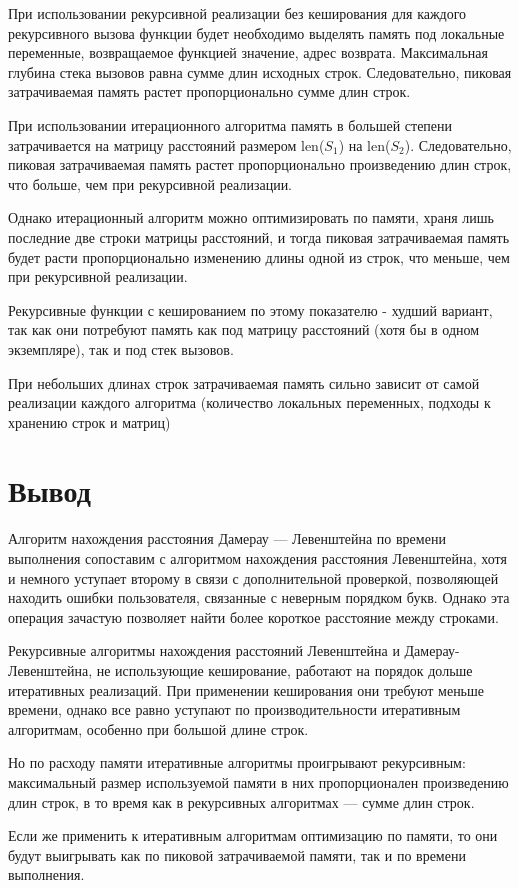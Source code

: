 При использовании рекурсивной реализации без кеширования для каждого рекурсивного вызова функции будет необходимо выделять память под локальные переменные, возвращаемое функцией значение, адрес возврата. Максимальная глубина стека вызовов равна сумме длин исходных строк. Следовательно, пиковая затрачиваемая память растет пропорционально сумме длин строк. 

При использовании итерационного алгоритма память в большей степени затрачивается на матрицу расстояний размером  len($S_{1}$) на len($S_{2}$). Следовательно, пиковая затрачиваемая память растет пропорционально произведению длин строк, что больше, чем при рекурсивной реализации.

Однако итерационный алгоритм можно оптимизировать по памяти, храня лишь последние две строки матрицы расстояний, и тогда пиковая затрачиваемая память будет расти пропорционально изменению длины одной из строк, что меньше, чем при рекурсивной реализации.

Рекурсивные функции с кешированием по этому показателю - худший вариант, так как они потребуют память как под матрицу расстояний (хотя бы в одном экземпляре), так и под стек вызовов.

При небольших длинах строк затрачиваемая память сильно зависит от самой реализации каждого алгоритма (количество локальных переменных, подходы к хранению строк и матриц)

\section*{Вывод}

Алгоритм нахождения расстояния Дамерау — Левенштейна по времени выполнения сопоставим с алгоритмом нахождения расстояния Левенштейна, хотя и немного уступает второму в связи с дополнительной проверкой, позволяющей находить ошибки пользователя, связанные с неверным порядком букв. Однако эта операция зачастую позволяет найти более короткое расстояние между строками.

Рекурсивные алгоритмы нахождения расстояний Левенштейна и Дамерау-Левенштейна, не использующие кеширование, работают на порядок дольше итеративных реализаций. При применении кеширования они требуют меньше времени, однако все равно уступают по производительности итеративным алгоритмам, особенно при большой длине строк. 

Но по расходу памяти итеративные алгоритмы проигрывают рекурсивным: максимальный размер используемой памяти в них пропорционален произведению длин строк, в то время как в рекурсивных алгоритмах — сумме длин строк.

Если же применить к итеративным алгоритмам оптимизацию по памяти, то они будут выигрывать как по пиковой затрачиваемой памяти, так и по времени выполнения.
